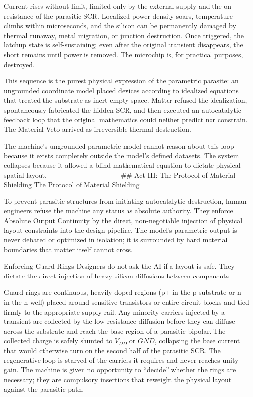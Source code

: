 Current rises without limit, limited only by the external supply and the on-resistance of the parasitic SCR. Localized power density soars, temperature climbs within microseconds, and the silicon can be permanently damaged by thermal runaway, metal migration, or junction destruction. Once triggered, the latchup state is self-sustaining; even after the original transient disappears, the short remains until power is removed. The microchip is, for practical purposes, destroyed.

This sequence is the purest physical expression of the parametric parasite: an ungrounded coordinate model placed devices according to idealized equations that treated the substrate as inert empty space. Matter refused the idealization, spontaneously fabricated the hidden SCR, and then executed an autocatalytic feedback loop that the original mathematics could neither predict nor constrain. The Material Veto arrived as irreversible thermal destruction.

The machine's ungrounded parametric model cannot reason about this loop because it exists completely outside the model's defined datasets. The system collapses because it allowed a blind mathematical equation to dictate physical spatial layout.
------------------------------
## Act III: The Protocol of Material Shielding
The Protocol of Material Shielding

To prevent parasitic structures from initiating autocatalytic destruction, human engineers refuse the machine any status as absolute authority. They enforce Absolute Output Continuity by the direct, non-negotiable injection of physical layout constraints into the design pipeline. The model’s parametric output is never debated or optimized in isolation; it is surrounded by hard material boundaries that matter itself cannot cross.

Enforcing Guard Rings  
Designers do not ask the AI if a layout is safe. They dictate the direct injection of heavy silicon diffusions between components.  

Guard rings are continuous, heavily doped regions (p+ in the p-substrate or n+ in the n-well) placed around sensitive transistors or entire circuit blocks and tied firmly to the appropriate supply rail. Any minority carriers injected by a transient are collected by the low-resistance diffusion before they can diffuse across the substrate and reach the base region of a parasitic bipolar. The collected charge is safely shunted to \(V_{DD}\) or \(GND\), collapsing the base current that would otherwise turn on the second half of the parasitic SCR. The regenerative loop is starved of the carriers it requires and never reaches unity gain. The machine is given no opportunity to “decide” whether the rings are necessary; they are compulsory insertions that reweight the physical layout against the parasitic path.

